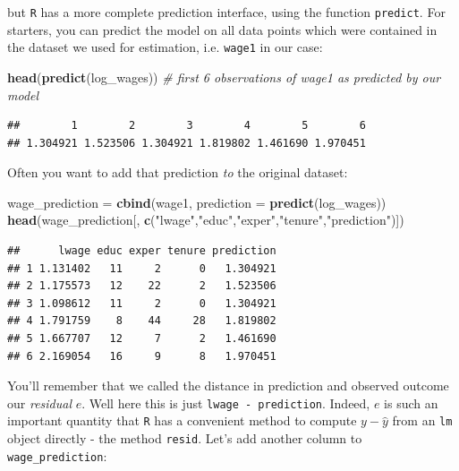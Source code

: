 \documentclass[]{book}
\newenvironment{Shaded}{\begin{snugshade}}{\end{snugshade}}
\newcommand{\KeywordTok}[1]{\textcolor[rgb]{0.13,0.29,0.53}{\textbf{#1}}}
\newcommand{\DataTypeTok}[1]{\textcolor[rgb]{0.13,0.29,0.53}{#1}}
\newcommand{\StringTok}[1]{\textcolor[rgb]{0.31,0.60,0.02}{#1}}
\newcommand{\CommentTok}[1]{\textcolor[rgb]{0.56,0.35,0.01}{\textit{#1}}}
\newcommand{\NormalTok}[1]{#1}
\begin{document}
but \texttt{R} has a more complete prediction interface, using the
function \texttt{predict}. For starters, you can predict the model on
all data points which were contained in the dataset we used for
estimation, i.e. \texttt{wage1} in our case:

\begin{Shaded}
\begin{Highlighting}[]
\KeywordTok{head}\NormalTok{(}\KeywordTok{predict}\NormalTok{(log_wages))  }\CommentTok{# first 6 observations of wage1 as predicted by our model}
\end{Highlighting}
\end{Shaded}

\begin{verbatim}
##        1        2        3        4        5        6 
## 1.304921 1.523506 1.304921 1.819802 1.461690 1.970451
\end{verbatim}

Often you want to add that prediction \emph{to} the original dataset:

\begin{Shaded}
\begin{Highlighting}[]
\NormalTok{wage_prediction =}\StringTok{ }\KeywordTok{cbind}\NormalTok{(wage1, }\DataTypeTok{prediction =} \KeywordTok{predict}\NormalTok{(log_wages))}
\KeywordTok{head}\NormalTok{(wage_prediction[, }\KeywordTok{c}\NormalTok{(}\StringTok{"lwage"}\NormalTok{,}\StringTok{"educ"}\NormalTok{,}\StringTok{"exper"}\NormalTok{,}\StringTok{"tenure"}\NormalTok{,}\StringTok{"prediction"}\NormalTok{)])}
\end{Highlighting}
\end{Shaded}

\begin{verbatim}
##      lwage educ exper tenure prediction
## 1 1.131402   11     2      0   1.304921
## 2 1.175573   12    22      2   1.523506
## 3 1.098612   11     2      0   1.304921
## 4 1.791759    8    44     28   1.819802
## 5 1.667707   12     7      2   1.461690
## 6 2.169054   16     9      8   1.970451
\end{verbatim}

You'll remember that we called the distance in prediction and observed
outcome our \emph{residual} \(e\). Well here this is just
\texttt{lwage\ -\ prediction}. Indeed, \(e\) is such an important
quantity that \texttt{R} has a convenient method to compute
\(y - \hat{y}\) from an \texttt{lm} object directly - the method
\texttt{resid}. Let's add another column to \texttt{wage\_prediction}:
\end{document}
